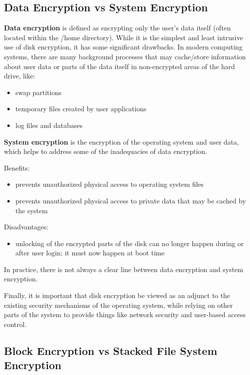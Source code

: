 \subsection{Data Encryption vs System Encryption}
\label{sub-sec:de-vs-se}

\textbf{Data encryption} is defined as encrypting only the user's data itself (often located within the /home directory). While it is the simplest and least intrusive use of disk encryption, it has some significant drawbacks.
In modern computing systems, there are many background processes that may cache/store information about user data or parts of the data itself in non-encrypted areas of the hard drive, like:
\begin{itemize}
\item swap partitions
\item temporary files created by user applications
\item log files and databases
\end{itemize}


\textbf{System encryption} is the encryption of the operating system and user data, which helps to address some of the inadequacies of data encryption.

Benefits:
\begin{itemize}
\item prevents unauthorized physical access to operating system files
\item prevents unauthorized physical access to private data that may be cached by the system
\end{itemize}
Disadvantages:
\begin{itemize}
\item unlocking of the encrypted parts of the disk can no longer happen during or after user login; it must now happen at boot time
\end{itemize}
In practice, there is not always a clear line between data encryption and system encryption.

Finally, it is important that disk encryption be viewed as an adjunct to the existing security mechanisms of the operating system, while relying on other parts of the system to provide things like network security and user-based access control.

\subsection{Block Encryption vs Stacked File System Encryption}
\label{sub-sec:be-vs-sfse}

